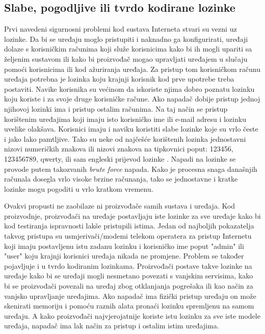 \documentclass[times, utf8, diplomski]{fer}
\begin{document}
\subsection{Slabe, pogodljive ili tvrdo kodirane lozinke}
Prvi navedeni sigurnosni problemi kod sustava Interneta stvari su vezni uz lozinke. Da bi se uređaju moglo pristupiti i naknadno ga konfigurirati, uređaji dolaze s korisničkim računima koji služe korisnicima kako bi ih mogli upariti sa željenim sustavom ili kako bi proizvođač mogao upravljati uređajem u slučaju pomoći korisnicima ili kod ažuriranja uređaja. Za pristup tom korisničkom računu uređaja potrebna je lozinka koju krajnji korisnik kod prve upotrebe treba postaviti. Navike korisnika su većinom da iskoriste njima dobro poznatu lozinku koju koriste i za svoje druge korisničke račune. Ako napadač dobije pristup jednoj njihovoj lozinki ima i pristup ostalim računima. Na taj način se pristup korištenim uređajima koji imaju isto korisničko ime ili e-mail adresu i lozinku uvelike olakšava. Korisnici imaju i naviku koristiti slabe lozinke koje su vrlo česte i jako lako pamtljive. Tako su neke od najčešće korištenih lozinka jednostavni nizovi numeričkih znakova ili nizovi znakova na tipkovnici poput: 123456, 123456789, qwerty, ili sam engleski prijevod lozinke \citep{pass1}. Napadi na lozinke se provode putem takozvanih \emph{brute force} napada. Kako je procesna snaga današnjih računala dosegla vrlo visoke brzine računanja, tako se jednostavne i kratke lozinke mogu pogoditi u vrlo kratkom vremenu.

Ovakvi propusti ne zaobilaze ni proizvođače samih sustava i uređaja. Kod proizvodnje, proizvođači na uređaje postavljaju iste lozinke za sve uređaje kako bi kod testiranja ispravnosti lakše pristupili istima. Jedan od najboljih pokazatelja takvog pristupa su usmjerivači/modemi telekom operatera za pristup Internetu koji imaju postavljenu istu zadanu lozinku i korisničko ime poput "admin" ili "user" koju krajnji korisnici uređaja nikada ne promjene. Problem se također pojavljuje i u tvrdo kodiranim  lozinkama. Proizvođači postave takve lozinke na uređaje kako bi se uređaji mogli nesmetano povezati s vanjskim servisima, kako bi se proizvođači povezali na uređaj zbog otklanjanja pogrešaka ili kao način za vanjsko upravljanje uređajima. Ako napadač ima fizički pristup uređaju on može skenirati memoriju i pomoću raznih alata pronaći lozinku spremljenu na samom uređaju. A kako proizvođači najvjerojatnije koriste istu lozinku za sve iste modele uređaja, napadač ima lak način za pristup i ostalim istim uređajima.
\end{document}
